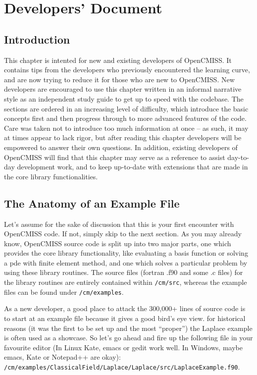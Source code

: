 \raggedbottom
\clearemptydoublepage
\chapter{Developers' Document}
\label{cha:developers}

\section{Introduction}
\label{sec:devel_intro}

This chapter is intented for new and existing developers of OpenCMISS. It contains tips
from the developers who previously encountered the learning curve, and are now trying to 
reduce it for those who are new to OpenCMISS. New developers are encouraged to use this
chapter written in an informal narrative style as an independent study guide to get up to 
speed with the codebase. The sections are ordered in an increasing level of difficulty,
which introduce the basic concepts first and then progress through to more advanced features 
of the code. Care was taken not to introduce too much information at once -- as such, it
may at times appear to lack rigor, but after reading this chapter developers will be 
empowered to answer their own questions. In addition, existing developers of OpenCMISS 
will find that this chapter may serve as a reference to assist day-to-day development work, 
and to keep up-to-date with extensions that are made in the core library functionalities.

\section{The Anatomy of an Example File}

Let's assume for the sake of discussion that this is your first encounter with OpenCMISS
code. If not, simply skip to the next section. As you may already know, OpenCMISS source 
code is split up into two major parts, one which provides the core library functionality, 
like evaluating a basis function or solving a pde with finite element method, and one which 
solves a particular problem by using these library routines. The source files (fortran .f90 
and some .c files) for the library routines are entirely contained within \texttt{/cm/src}, 
whereas the example files can be found under \texttt{/cm/examples}. 

As a new developer, a good place to attack the 300,000+ lines of source code is to start 
at an example file because it gives a good bird's eye view. for historical reasons (it was 
the first to be set up and the most ``proper'') the Laplace example is often used as a 
showcase. So let's go ahead and fire up the following file in your favourite editor (In Linux
Kate, emacs or gedit work well. In Windows, maybe emacs, Kate or Notepad++ are okay):\\
\texttt{/cm/examples/ClassicalField/Laplace/Laplace/src/LaplaceExample.f90}.

